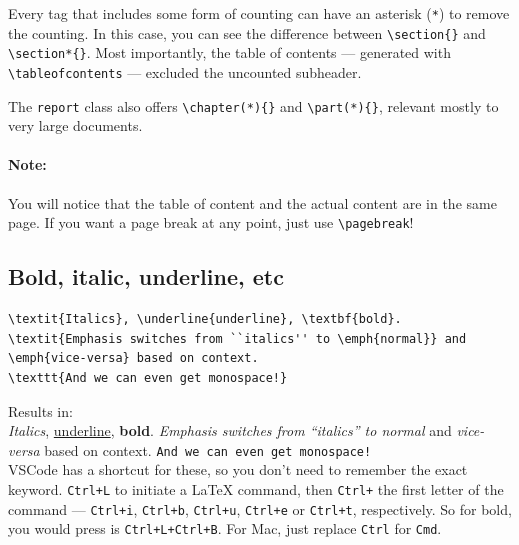 Every tag that includes some form of counting can have an asterisk (\verb|*|) to remove the counting.
In this case, you can see the difference between \verb|\section{}| and \verb|\section*{}|.
Most importantly, the table of contents --- generated with \verb|\tableofcontents| --- excluded the uncounted subheader.

The \verb|report| class also offers \verb|\chapter(*){}| and \verb|\part(*){}|, relevant mostly to very large documents.

\paragraph{Note:} You will notice that the table of content and the actual content are in the same page. If you want a page break at any point, just use \verb|\pagebreak|!

\subsection{Bold, italic, underline, etc}

\begin{lstlisting}
\textit{Italics}, \underline{underline}, \textbf{bold}.
\textit{Emphasis switches from ``italics'' to \emph{normal}} and \emph{vice-versa} based on context.
\texttt{And we can even get monospace!}
\end{lstlisting}
Results in: \\
\textit{Italics}, \underline{underline}, \textbf{bold}.
\textit{Emphasis switches from ``italics'' to \emph{normal}} and \emph{vice-versa} based on context.
\texttt{And we can even get monospace!}\\

VSCode has a shortcut for these, so you don't need to remember the exact keyword. \verb|Ctrl+L| to initiate a LaTeX command, then \verb|Ctrl+| the first letter of the command --- \verb|Ctrl+i|, \verb|Ctrl+b|, \verb|Ctrl+u|, \verb|Ctrl+e| or \verb|Ctrl+t|, respectively.
So for bold, you would press is \verb|Ctrl+L+Ctrl+B|.
For Mac, just replace \verb|Ctrl| for \verb|Cmd|.

